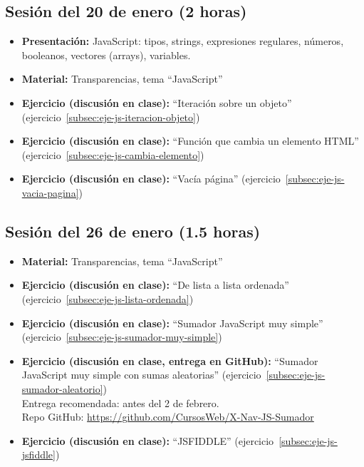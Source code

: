 \documentclass[a4paper,12pt]{report}
\begin{document}
\subsection{Sesión del 20 de enero (2 horas)}

\begin{itemize}
\item \textbf{Presentación:} JavaScript: tipos, strings, expresiones regulares, números, booleanos, vectores (arrays), variables.
\item \textbf{Material:} Transparencias, tema ``JavaScript''
\item \textbf{Ejercicio (discusión en clase):} ``Iteración sobre un objeto'' (ejercicio~\ref{subsec:eje-js-iteracion-objeto})
\item \textbf{Ejercicio (discusión en clase):} ``Función que cambia un elemento HTML'' (ejercicio~\ref{subsec:eje-js-cambia-elemento})
\item \textbf{Ejercicio (discusión en clase):} ``Vacía página'' (ejercicio~\ref{subsec:eje-js-vacia-pagina})
\end{itemize}


\subsection{Sesión del 26 de enero (1.5 horas)}

\begin{itemize}
\item \textbf{Material:} Transparencias, tema ``JavaScript''
\item \textbf{Ejercicio (discusión en clase):} ``De lista a lista ordenada'' (ejercicio~\ref{subsec:eje-js-lista-ordenada})
\item \textbf{Ejercicio (discusión en clase):} ``Sumador JavaScript muy simple'' (ejercicio~\ref{subsec:eje-js-sumador-muy-simple})
\item \textbf{Ejercicio (discusión en clase, entrega en GitHub):} ``Sumador JavaScript muy simple con sumas aleatorias'' (ejercicio~\ref{subsec:eje-js-sumador-aleatorio}) \\
  Entrega recomendada: antes del 2 de febrero. \\
  Repo GitHub: \url{https://github.com/CursosWeb/X-Nav-JS-Sumador}
\item \textbf{Ejercicio (discusión en clase):} ``JSFIDDLE'' (ejercicio~\ref{subsec:eje-js-jsfiddle})
\end{itemize}
\end{document}

